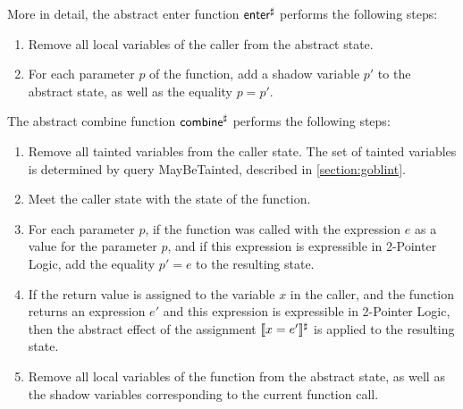 More in detail, the abstract enter function $\textsf{enter}^\sharp$ performs the following steps:
\begin{enumerate}
    \item Remove all local variables of the caller from the abstract state.
    \item For each parameter $p$ of the function, add a shadow variable $p'$ to the abstract state,
as well as the equality $p = p'$.
\end{enumerate}

The abstract combine function $\textsf{combine}^\sharp$ performs the following steps:
\begin{enumerate}
    \item Remove all tainted variables from the caller state. The set of tainted variables is determined by query \textsf{MayBeTainted}, described in \cref{section:goblint}.
    \item Meet the caller state with the state of the function.
    \item For each parameter $p$, if the function was called with the
    expression $e$ as a value for the parameter $p$, and if this expression is expressible in 2-Pointer Logic,
     add the equality $p' = e$ to the resulting state.
    \item If the return value is assigned to the variable $x$ in the caller,
    and the function returns an expression $e'$ and this expression is expressible in 2-Pointer Logic,
    then the abstract effect of the assignment $\llbracket x = e'\rrbracket^\sharp$ is applied to the resulting state.
    \item Remove all local variables of the function from the abstract state,
    as well as the shadow variables corresponding to the current function call.
\end{enumerate}
